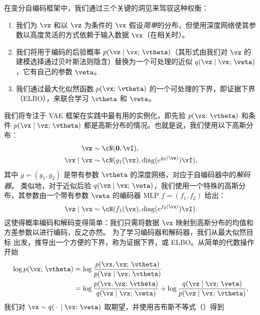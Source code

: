 \documentclass[../../book-main_zh.tex]{subfiles}
\begin{document}
在变分自编码框架中，我们通过三个关键的洞见来驾驭这种权衡：
\begin{enumerate}
\item 我们为 $\vz$ 和以 $\vz$ 为条件的 $\vx$ 假设\textit{简单}的分布，但使用深度网络使其参数以高度灵活的方式依赖于输入数据 $\vx$（在相关时）。
\item 我们将用于编码的后验概率 $p(\vz \mid \vx;\, \vtheta)$（其形式由我们对 $\vz$ 的建模选择通过贝叶斯法则隐含）替换为一个可处理的近似 $q(\vz \mid \vx;\, \veta)$，它有自己的参数 $\veta$。
\item 我们通过最大化似然函数 $p(\vx ;\, \vtheta)$ 的一个可处理的下界，即证据下界（ELBO），来联合学习 $\vtheta$ 和 $\veta$。
\end{enumerate}
我们将专注于 VAE 框架在实践中最有用的实例化，即先验 $p(\vz ;\, \vtheta)$ 和条件 $p(\vx \mid \vz;\,
\vtheta)$ 都是高斯分布的情况。也就是说，我们使用以下高斯分布：
\begin{align*}
\vz &\sim \cN(\Zero, \vI), \\
\vx \mid \vz &\sim \cN(g_1(\vz), \diag(e^{g_2(\vz)}) \vI),
\end{align*}
其中 $g = (g_1, g_2)$ 是带有参数 $\vtheta$ 的深度网络，对应于自编码器中的\textit{解码器}。
类似地，对于近似后验 $q(\vz \mid \vx;\, \veta)$，我们使用一个特殊的高斯分布，其参数由一个带有参数 $\veta$ 的编码器 MLP $f = (f_1, f_2)$ 给出：
\begin{equation*}
\vz \mid \vx \sim \cN(f_1(\vx), \diag(e^{f_2(\vx)}) \vI).
\end{equation*}
这使得概率编码和解码变得简单：我们只需将数据 $\vx$ 映射到高斯分布的均值和方差参数以进行编码，反之亦然。
为了学习编码器和解码器，我们从最大似然目标  出发，推导出一个方便的下界，称为证据下界，或 ELBO。从简单的代数操作开始
\begin{align*}
\log p(\vx;\, \vtheta) &=
\log \frac{p(\vx, \vz;\, \vtheta)}{p(\vz \mid \vx;\, \vtheta)}
\\
&=
\log \frac{p(\vx, \vz;\, \vtheta)}{q(\vz \mid \vx;\, \veta)}
+
\log \frac{q(\vz \mid \vx;\, \veta)}{p(\vz \mid \vx;\, \vtheta)},
\end{align*}
我们对 $\vz \sim q(\,\cdot\, \mid
\vx;\, \veta)$ 取期望，并使用吉布斯不等式（）得到
\end{document}
